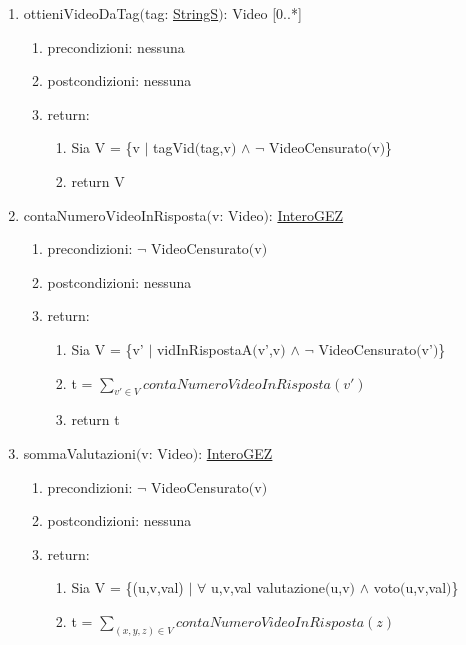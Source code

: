 \documentclass{article}
\begin{document}
\begin{enumerate}
\begin{enumerate}
        \item ottieniVideoDaTag$($tag: \hyperref[sec:TipoStringS]{StringS}$)$: Video [0..*]
        \begin{enumerate}
            \item precondizioni: nessuna
            \item postcondizioni: nessuna
            \item return:
            \begin{enumerate}
                \item Sia V = \{v $|$ tagVid$($tag,v$)$ $\land$ $\neg$ VideoCensurato$($v$)$\}
                \item return V
            \end{enumerate}
        \end{enumerate}
        \item contaNumeroVideoInRisposta$($v: Video$)$: \hyperref[sec:TipoInteroGEZ]{InteroGEZ}
        \begin{enumerate}
            \item precondizioni: $\neg$ VideoCensurato$($v$)$
            \item postcondizioni: nessuna
            \item return:
            \begin{enumerate}
                \item Sia V = \{v' $|$ vidInRispostaA$($v',v$)$ $\land$ $\neg$ VideoCensurato$($v'$)$\}
                \item t = $\sum_{v' \in V} contaNumeroVideoInRisposta(v')$
                \item return t
            \end{enumerate}
        \end{enumerate}
        \item sommaValutazioni$($v: Video$)$: \hyperref[sec:TipoInteroGEZ]{InteroGEZ}
        \begin{enumerate}
            \item precondizioni: $\neg$ VideoCensurato$($v$)$
            \item postcondizioni: nessuna
            \item return:
            \begin{enumerate}
                \item Sia V = \{(u,v,val) $|$ $\forall$ u,v,val valutazione$($u,v$)$ $\land$ voto$($u,v,val$)$\}
                \item t = $\sum_{(x,y,z) \in V} contaNumeroVideoInRisposta(z)$

\end{enumerate}
\end{enumerate}
\end{enumerate}
\end{enumerate}
\end{document}

